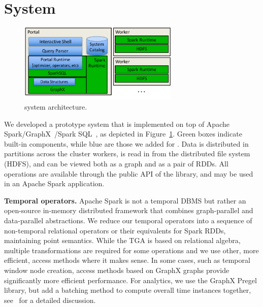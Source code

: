 \section{System}
\label{sec:sys}

\begin{figure}[t]
\centering
\includegraphics[width=3in]{figs/architecture.pdf}
\vspace{-0.5cm}
\caption{\sys system architecture.}
\vspace{-0.5cm}
\label{fig:arch}
\end{figure}

We developed a prototype system \sys that is implemented on top of
Apache Spark/GraphX~\cite{DBLP:conf/osdi/GonzalezXDCFS14}/Spark
SQL~\cite{Armbrust2015}, as depicted in Figure~\ref{fig:arch}.  Green
boxes indicate built-in components, while blue are those we added for
\sys.  Data is distributed in partitions across the cluster workers,
is read in from the distributed file system (HDFS), and can be viewed
both as a graph and as a pair of RDDs.  All \tg operations are
available through the public API of the \sys library, and may be used
in an Apache Spark application.

{\bf Temporal operators.}  Apache Spark is not a temporal DBMS but
rather an open-source in-memory distributed framework that combines
graph-parallel and data-parallel abstractions.  We reduce our temporal
operators into a sequence of non-temporal relational operators or
their equivalents for Spark RDDs, maintaining point semantics.  While
the TGA is based on relational algebra, multiple transformations are
required for some operations and we use other, more efficient, access
methods where it makes sense.  In some cases, such as temporal window
node creation, access methods based on GraphX graphs provide
significantly more efficient performance.  For analytics, we use the
GraphX Pregel library, but add a batching method to compute overall
time instances together, see~\cite{MoffittTempWeb16} for a detailed
discussion.

